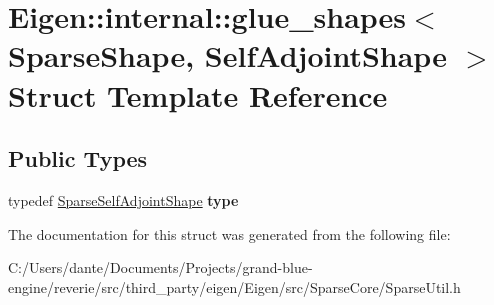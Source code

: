 \hypertarget{struct_eigen_1_1internal_1_1glue__shapes_3_01_sparse_shape_00_01_self_adjoint_shape_01_4}{}\section{Eigen\+::internal\+::glue\+\_\+shapes$<$ Sparse\+Shape, Self\+Adjoint\+Shape $>$ Struct Template Reference}
\label{struct_eigen_1_1internal_1_1glue__shapes_3_01_sparse_shape_00_01_self_adjoint_shape_01_4}
\subsection*{Public Types}
\begin{DoxyCompactItemize}
\item 
\mbox{\label{struct_eigen_1_1internal_1_1glue__shapes_3_01_sparse_shape_00_01_self_adjoint_shape_01_4_a70896a5002f3928206d3bba0511372b1}} 
typedef \mbox{\hyperlink{struct_eigen_1_1internal_1_1_sparse_self_adjoint_shape}{Sparse\+Self\+Adjoint\+Shape}} {\bfseries type}
\end{DoxyCompactItemize}


The documentation for this struct was generated from the following file\+:\begin{DoxyCompactItemize}
\item 
C\+:/\+Users/dante/\+Documents/\+Projects/grand-\/blue-\/engine/reverie/src/third\+\_\+party/eigen/\+Eigen/src/\+Sparse\+Core/Sparse\+Util.\+h\end{DoxyCompactItemize}
